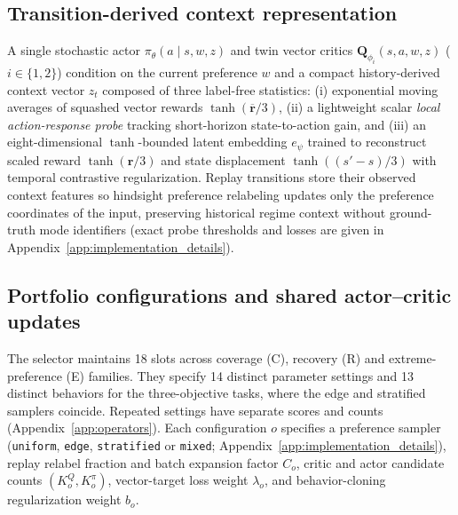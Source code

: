 

\subsection{Transition-derived context representation}

A single stochastic actor $\pi_\theta(a \mid s, w, z)$ and twin vector critics
$\mathbf{Q}_{\phi_i}(s, a, w, z)$ ($i \in \{1,2\}$) condition on the current
preference $w$ and a compact history-derived context vector $z_t$ composed of
three label-free statistics: (i) exponential moving averages of squashed vector
rewards $\tanh(\overline{\mathbf{r}}/3)$, (ii) a lightweight scalar
\emph{local action-response probe} tracking short-horizon state-to-action
gain, and (iii) an eight-dimensional $\tanh$-bounded latent embedding $e_\psi$
trained to reconstruct scaled reward $\tanh(\mathbf{r}/3)$ and state
displacement $\tanh((s'-s)/3)$ with temporal contrastive regularization.
Replay transitions store their observed context features so hindsight
preference relabeling updates only the preference coordinates of the input,
preserving historical regime context without ground-truth mode identifiers
(exact probe thresholds and losses are given in
Appendix~\ref{app:implementation_details}).

\subsection{Portfolio configurations and shared actor--critic updates}
\label{sec:operator_portfolio}

The selector maintains 18 slots across coverage (C), recovery (R) and
extreme-preference (E) families. They specify 14 distinct parameter settings
and 13 distinct behaviors for the three-objective tasks, where the edge and
stratified samplers coincide. Repeated settings have separate scores and counts
(Appendix~\ref{app:operators}). Each configuration $o$ specifies a preference
sampler (\texttt{uniform}, \texttt{edge}, \texttt{stratified} or \texttt{mixed};
Appendix~\ref{app:implementation_details}), replay relabel fraction and batch
expansion factor $C_o$, critic and actor candidate counts $(K_o^Q, K_o^\pi)$,
vector-target loss weight $\lambda_o$, and behavior-cloning regularization
weight $b_o$.

